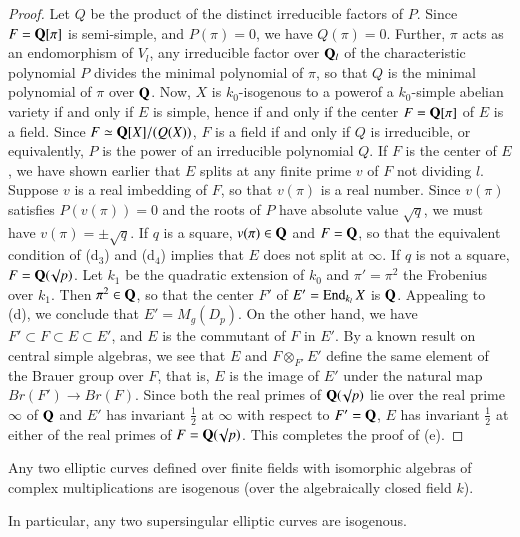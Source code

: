 \begin{proof}
Let $Q$ be the product of the distinct irreducible factors of $P$. Since $F = \mathbf{Q} [\pi]$ is semi-simple, and $P(\pi) = 0$, we have $Q(\pi) =0$. Further, $\pi$ acts as an endomorphism of $V_l$, any irreducible factor over $\mathbf{Q}_l$ of the characteristic polynomial $P$ divides the minimal polynomial of $\pi$, so that $Q$ is the minimal polynomial of $\pi$ over $\mathbf{Q}$. Now, $X$ is $k_0$-isogenous to a power\pageoriginale of a $k_0$-simple abelian variety if and only if $E$ is simple, hence if and only if the center $F = \mathbf{Q} [\pi]$ of $E$ is a field. Since $F \simeq \mathbf{Q}[X]/ (Q(X))$, $F$ is a field if and only if $Q$ is irreducible, or equivalently, $P$ is the power of an irreducible polynomial $Q$. If $F$ is the center of $E$, we have shown earlier that $E$ splits at any finite prime $v$ of $F$ not dividing $l$. Suppose $v$ is a real imbedding of $F$, so that $v(\pi)$ is a real number. Since $v(\pi)$ satisfies $P(v(\pi)) =0$ and the roots of $P$ have absolute value $\surd q$, we must have $v(\pi) = \pm \surd q$. If $q$ is a square, $v(\pi) \in \mathbf{Q}$ and $F = \mathbf{Q}$, so that the equivalent condition of (d$_3$) and (d$_4$) implies that $E$ does not split at $\infty$. If $q$ is not a square, $F = \mathbf{Q}(\surd p)$. Let $k_1$ be the quadratic extension of $k_0$ and $\pi' = \pi^2$ the Frobenius over $k_1$. Then $\pi^2 \in \mathbf{Q}$, so that the center $F'$ of $E' = \operatorname{End}_{k_l} X$ is $\mathbf{Q}$. Appealing to (d), we conclude that $E' = M_g (D_p)$. On the other hand, we have $F' \subset F \subset E \subset E'$, and $E$ is the commutant of $F$ in $E'$. By a known result on central simple algebras, we see that $E$ and $F \otimes_{F'} E'$ define the same element of the Brauer group over $F$, that is, $E$ is the image of $E'$ under the natural map $Br(F') \to Br(F)$. Since both the real primes of $\mathbf{Q}(\surd p)$ lie over the real prime $\infty$ of $\mathbf{Q}$ and $E'$ has invariant $\frac{1}{2}$ at $\infty$ with respect to $F' = \mathbf{Q}$, $E$ has invariant $\frac{1}{2}$ at either of the real primes of $F = \mathbf{Q}(\surd p)$. This completes the proof of (e).

\end{proof} 
\begin{coro*}
Any two elliptic curves defined over finite fields with isomorphic algebras of complex multiplications are isogenous (over the algebraically closed field $k$). 

In particular, any two supersingular elliptic curves are isogenous.
\end{coro*}

